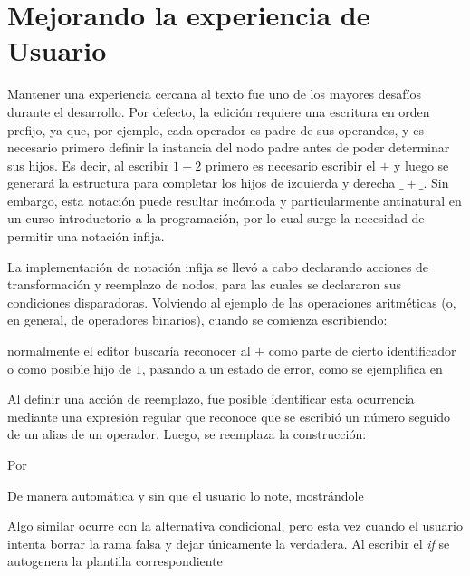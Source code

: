 \section{Mejorando la experiencia de Usuario}\label{usabilidad}

Mantener una experiencia cercana al texto fue uno de los mayores desafíos durante el desarrollo. Por defecto, la edición requiere una escritura en orden prefijo, ya que, por ejemplo, cada operador es padre de sus operandos, y es necesario primero definir la instancia del nodo padre antes de poder determinar sus hijos.
Es decir, al escribir $1+2$ primero es necesario escribir el $+$ y luego se generará la estructura para completar los hijos de izquierda y derecha $\_ + \_$. Sin embargo, esta notación puede resultar incómoda y particularmente antinatural en un curso introductorio a la programación, por lo cual surge la necesidad de permitir una notación infija.

La implementación de notación infija se llevó a cabo declarando acciones de transformación y reemplazo de nodos, para las cuales se declararon sus condiciones disparadoras. 
Volviendo al ejemplo de las operaciones aritméticas (o, en general, de operadores binarios), cuando se comienza escribiendo:

\centertree{
  [1
    [+]
  ]
}



normalmente el editor buscaría reconocer al $+$ como parte de cierto identificador o como posible hijo de $1$, pasando a un estado de error, como se ejemplifica en 


Al definir una acción de reemplazo, fue posible identificar esta ocurrencia mediante una expresión regular que reconoce que se escribió un número seguido de un alias de un operador. Luego, se reemplaza la construcción:

\centertree{
  [1
    [+]
    [empty]
  ]
}

Por 
\centertree{
  [+
    [1]
    [empty]
  ]
}

De manera automática y sin que el usuario lo note, mostrándole 


Algo similar ocurre con la alternativa condicional, pero esta vez cuando el usuario intenta borrar la rama falsa y dejar únicamente la verdadera.
Al escribir el \emph{if} se autogenera la plantilla correspondiente 

